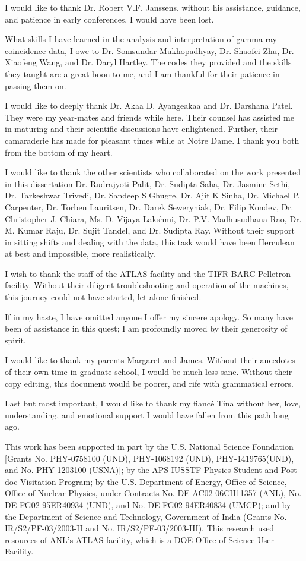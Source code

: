 \documentclass[final,numrefs,sort&compress]{nddiss2e}
\begin{document}
\begin{acknowledge}
I would like to thank Dr. Robert V.F. Janssens, without his assistance, guidance, and patience in early conferences, I would have been lost.

What skills I have learned in the analysis and interpretation of gamma-ray coincidence data, I owe to Dr. Somsundar Mukhopadhyay, Dr. Shaofei Zhu, Dr. Xiaofeng Wang, and Dr. Daryl Hartley. The codes they provided and the skills they taught are a great boon to me, and I am thankful for their patience in passing them on.

I would like to deeply thank Dr. Akaa D. Ayangeakaa and Dr. Darshana Patel. They were my year-mates and friends while here. Their counsel has assisted me in maturing and their scientific discussions have enlightened. Further, their camaraderie has made for pleasant times while at Notre Dame. I thank you both from the bottom of my heart.

I would like to thank the other scientists who collaborated on the work presented in this dissertation Dr. Rudrajyoti Palit, Dr. Sudipta Saha, Dr. Jasmine Sethi, Dr. Tarkeshwar Trivedi, Dr. Sandeep S Ghugre, Dr. Ajit K Sinha, Dr. Michael P. Carpenter, Dr. Torben Lauritsen, Dr. Darek Seweryniak, Dr. Filip Kondev, Dr. Christopher J. Chiara, Ms. D. Vijaya Lakshmi,  Dr. P.V. Madhusudhana Rao, Dr. M. Kumar Raju, Dr. Sujit Tandel, and Dr. Sudipta Ray. Without their support in sitting shifts and dealing with the data, this task would have been Herculean at best and impossible, more realistically.

I wish to thank the staff of the ATLAS facility and the TIFR-BARC Pelletron facility. Without their diligent troubleshooting and operation of the machines, this journey could not have started, let alone finished.

If in my haste, I have omitted anyone I offer my sincere apology. So many have been of assistance in this quest; I am profoundly moved by their generosity of spirit.

I would like to thank my parents Margaret and James. Without their anecdotes of their own time in graduate school, I would be much less sane. Without their copy editing, this document would be poorer, and rife with grammatical errors.

Last but most important, I would like to thank my fianc\'{e} Tina without her, love, understanding, and emotional support I would have fallen from this path long ago.

This work has been supported in part by the U.S. National Science Foundation [Grants No. PHY-0758100 (UND), PHY-1068192 (UND), PHY-1419765(UND), and No. PHY-1203100 (USNA)]; by the APS-IUSSTF Physics Student and Post-doc Visitation Program; by the U.S. Department of Energy, Office of Science, Office of Nuclear  Physics,  under  Contracts  No.  DE-AC02-06CH11357 (ANL), No. DE-FG02-95ER40934 (UND), and No. DE-FG02-94ER40834 (UMCP); and by the Department of Science and Technology, Government of India (Grants No. IR/S2/PF-03/2003-II and No. IR/S2/PF-03/2003-III). This research used resources of ANL’s ATLAS facility, which is a DOE Office of Science User Facility.
\end{acknowledge}
\end{document}
